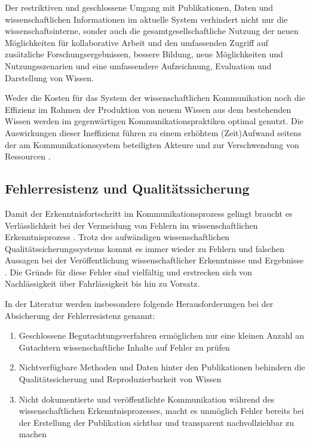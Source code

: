 Der restriktiven und geschlossene Umgang mit Publikationen, Daten und wissenschaftlichen Informationen im aktuelle System verhindert nicht nur die wissenschaftsinterne, sonder auch die gesamtgesellschaftliche Nutzung der neuen Möglichkeiten für kollaborative Arbeit und den umfassenden Zugriff auf zusätzliche Forschungsergebnissen, bessere Bildung, neue Möglichkeiten und Nutzungsszenarien und eine umfassendere Aufzeichnung, Evaluation und Darstellung von Wissen.

Weder die Kosten für das System der wissenschaftlichen Kommunikation noch die Effizienz im Rahmen der Produktion von neuem Wissen aus dem bestehenden Wissen werden im gegenwärtigen Kommunikationspraktiken optimal genutzt. Die Auswirkungen dieser Ineffizienz führen zu einem erhöhtem (Zeit)Aufwand seitens der am Kommunikationssystem beteiligten Akteure und zur Verschwendung von Ressourcen \cite{nosek_2012_scientific}.

\subsection{Fehlerresistenz und Qualitätssicherung}

Damit der Erkenntnisfortschritt im Kommunikationsprozess gelingt braucht es Verlässlichkeit bei der Vermeidung von Fehlern im wissenschaftlichen Erkenntnisprozess \cite{Bargheer_2015}. Trotz des aufwändigen wissenschaftlichen Qualitätssicherungssystems kommt es immer wieder zu Fehlern und falschen Aussagen bei der Veröffentlichung wissenschaftlicher Erkenntnisse und Ergebnisse \cite{brembs2015open} \cite{Luescher_2014}. Die Gründe für diese Fehler sind vielfältig und erstrecken sich von Nachlässigkeit über Fahrlässigkeit bis hin zu Vorsatz.

In der Literatur werden insbesondere folgende Herausforderungen bei der Absicherung der Fehlerresistenz genannt:
\begin{enumerate}
\item Geschlossene Begutachtungsverfahren ermöglichen nur eine kleinen Anzahl an Gutachtern wissenschaftliche Inhalte auf Fehler zu prüfen \cite{suchen}
\item Nichtverfügbare Methoden und Daten hinter den Publikationen behindern die Qualitätssicherung und Reproduzierbarkeit von Wissen \cite{suchen}
\item Nicht dokumentierte und veröffentlichte Kommunikation während des wissenschaftlichen Erkenntnisprozesses, macht es unmöglich Fehler bereits bei der Erstellung der Publikation sichtbar und transparent nachvollziehbar zu machen \cite{suchen}
\end{enumerate}

